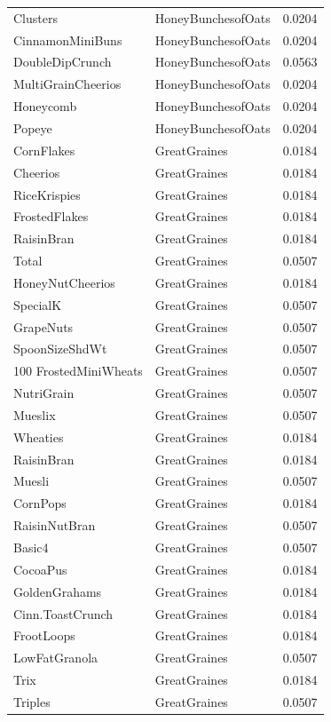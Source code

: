 \begin{longtable}{llr}
Clusters & HoneyBunchesofOats & 0.0204 \\
CinnamonMiniBuns & HoneyBunchesofOats & 0.0204 \\
DoubleDipCrunch & HoneyBunchesofOats & 0.0563 \\
MultiGrainCheerios & HoneyBunchesofOats & 0.0204 \\
Honeycomb & HoneyBunchesofOats & 0.0204 \\
Popeye & HoneyBunchesofOats & 0.0204 \\
CornFlakes & GreatGraines & 0.0184 \\
Cheerios & GreatGraines & 0.0184 \\
RiceKrispies & GreatGraines & 0.0184 \\
FrostedFlakes & GreatGraines & 0.0184 \\
RaisinBran & GreatGraines & 0.0184 \\
Total & GreatGraines & 0.0507 \\
HoneyNutCheerios & GreatGraines & 0.0184 \\
SpecialK & GreatGraines & 0.0507 \\
GrapeNuts & GreatGraines & 0.0507 \\
SpoonSizeShdWt & GreatGraines & 0.0507 \\
100%
FrostedMiniWheats & GreatGraines & 0.0507 \\
NutriGrain & GreatGraines & 0.0507 \\
Mueslix & GreatGraines & 0.0507 \\
Wheaties & GreatGraines & 0.0184 \\
RaisinBran & GreatGraines & 0.0184 \\
Muesli & GreatGraines & 0.0507 \\
CornPops & GreatGraines & 0.0184 \\
RaisinNutBran & GreatGraines & 0.0507 \\
Basic4 & GreatGraines & 0.0507 \\
CocoaPus & GreatGraines & 0.0184 \\
GoldenGrahams & GreatGraines & 0.0184 \\
Cinn.ToastCrunch & GreatGraines & 0.0184 \\
FrootLoops & GreatGraines & 0.0184 \\
LowFatGranola & GreatGraines & 0.0507 \\
Trix & GreatGraines & 0.0184 \\
Triples & GreatGraines & 0.0507 \\

\end{longtable}
